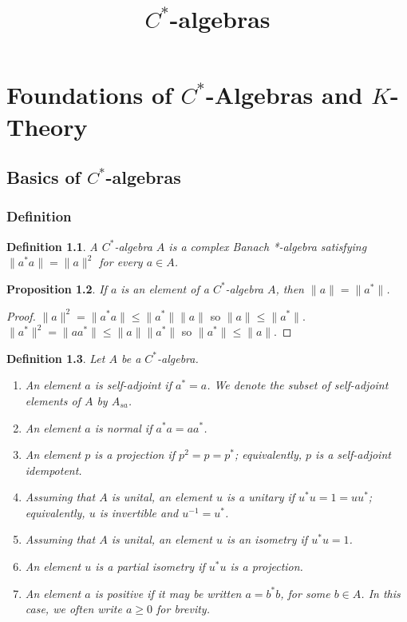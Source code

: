 \documentclass{book}
\title{\(C^*\)-algebras}
\author{}
\date{}
\newtheorem{definition}{Definition}[section]
\newtheorem{proposition}[definition]{Proposition}
\begin{document}
\maketitle

\tableofcontents
\part{\texorpdfstring{Foundations of \(C^*\)-Algebras and \(K\)-Theory}
                     {Foundations of C*-Algebras and K-Theory}}
\chapter{Basics of \texorpdfstring{\(C^*\)-algebras}{C*algebras}}
\section{Definition}
\begin{definition}
  A \textnormal{\(C^*\)-algebra} \(A\) is a complex Banach *-algebra satisfying
  \(\|a^*a\| = \|a\|^2\) for every \(a\in A\).
\end{definition}
\begin{proposition}
  If \(a\) is an element of a \(C^*\)-algebra \(A\), then \(\|a\|=\|a^*\|\).
\end{proposition}
\begin{proof}
  \(\|a\|^2=\|a^*a\|\leq\|a^*\|\|a\|\) so \(\|a\|\leq\|a^*\|\).\\
  \(\|a^*\|^2=\|aa^*\|\leq\|a\|\|a^*\|\) so \(\|a^*\|\leq\|a\|\).
\end{proof}
\begin{definition}
  Let \(A\) be a \(C^*\)-algebra.  
  \begin{enumerate}
    \item An element \(a\) is \textnormal{self-adjoint} if \(a^*=a\). We denote the subset of self-adjoint elements of \(A\) by \(A_{sa}\). 
    \item An element \(a\) is \textnormal{normal} if \(a^*a = aa^*\).
    \item An element \(p\) is a \textnormal{projection} if \(p^2 = p = p^*\); equivalently, \(p\) is a self-adjoint idempotent.
    \item Assuming that \(A\) is unital, an element \(u\) is a \textnormal{unitary} if \(u^*u = 1 = uu^*\); equivalently, \(u\) is invertible and \(u^{-1} = u^*\).
    \item Assuming that \(A\) is unital, an element \(u\) is an \textnormal{isometry} if \(u^*u = 1\).
    \item An element \(u\) is a \textnormal{partial isometry} if \(u^*u\) is a projection.
    \item An element \(a\) is \textnormal{positive} if it may be written \(a = b^*b\), for some \(b \in A\). In this case, we often write \(a \geq 0\) for brevity.
  \end{enumerate}
\end{definition}
\end{document}
